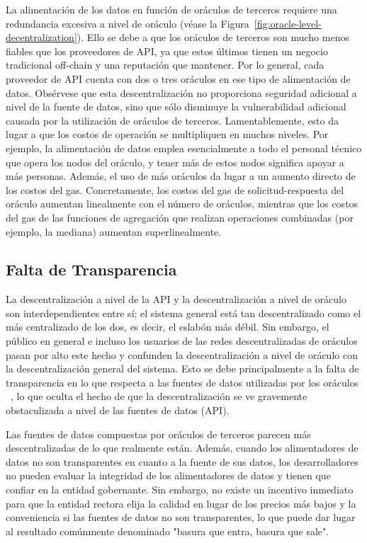 \documentclass[11pt]{article}
\begin{document}
La alimentación de los datos en función de oráculos de terceros requiere una redundancia excesiva a nivel de oráculo (véase la Figura~\ref{fig:oracle-level-decentralization}).
Ello se debe a que los oráculos de terceros son mucho menos fiables que los proveedores de API, ya que estos últimos tienen un negocio tradicional off-chain y una reputación que mantener. Por lo general, cada proveedor de API cuenta con dos o tres oráculos en ese tipo de alimentación de datos. Obsérvese que esta descentralización no proporciona seguridad adicional a nivel de la fuente de datos, sino que sólo disminuye la vulnerabilidad adicional causada por la utilización de oráculos de terceros. Lamentablemente, esto da lugar a que los costos de operación se multipliquen en muchos niveles. Por ejemplo, la alimentación de datos emplea esencialmente a todo el personal técnico que opera los nodos del oráculo, y tener más de estos nodos significa apoyar a más personas. Además, el uso de más oráculos da lugar a un aumento directo de los costos del gas. Concretamente, los costos del gas de solicitud-respuesta del oráculo aumentan linealmente con el número de oráculos, mientras que los costos del gas de las funciones de agregación que realizan operaciones combinadas (por ejemplo, la mediana) aumentan superlinealmente.

\subsection{Falta de Transparencia}
\label{sec:lack-of-transparency}

La descentralización a nivel de la API y la descentralización a nivel de oráculo son interdependientes entre sí; el sistema general está tan descentralizado como el más centralizado de los dos, es decir, el eslabón más débil. Sin embargo, el público en general e incluso los usuarios de las redes descentralizadas de oráculos pasan por alto este hecho y confunden la descentralización a nivel de oráculo con la descentralización general del sistema. Esto se debe principalmente a la falta de transparencia en lo que respecta a las fuentes de datos utilizadas por los oráculos ~\cite{feeds.chain.link}, lo que oculta el hecho de que la descentralización se ve gravemente obstaculizada a nivel de las fuentes de datos (API).

Las fuentes de datos compuestas por oráculos de terceros parecen más descentralizadas de lo que realmente están.  Además, cuando los alimentadores de datos no son transparentes en cuanto a la fuente de sus datos, los desarrolladores no pueden evaluar la integridad de los alimentadores de datos y tienen que confiar en la entidad gobernante. Sin embargo, no existe un incentivo inmediato para que la entidad rectora elija la calidad en lugar de los precios más bajos y la conveniencia si las fuentes de datos no son transparentes, lo que puede dar lugar al resultado comúnmente denominado "basura que entra, basura que sale".
\end{document}
